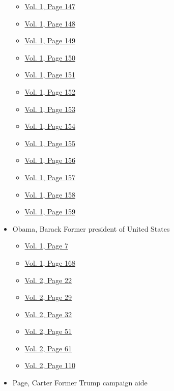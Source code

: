 \begin{itemize}
  \begin{itemize}
  \tightlist
  \item
    \protect\hyperlink{g-page-155}{Vol. 1, Page 147}
  \item
    \protect\hyperlink{g-page-156}{Vol. 1, Page 148}
  \item
    \protect\hyperlink{g-page-157}{Vol. 1, Page 149}
  \item
    \protect\hyperlink{g-page-158}{Vol. 1, Page 150}
  \item
    \protect\hyperlink{g-page-159}{Vol. 1, Page 151}
  \item
    \protect\hyperlink{g-page-160}{Vol. 1, Page 152}
  \item
    \protect\hyperlink{g-page-161}{Vol. 1, Page 153}
  \item
    \protect\hyperlink{g-page-162}{Vol. 1, Page 154}
  \item
    \protect\hyperlink{g-page-163}{Vol. 1, Page 155}
  \item
    \protect\hyperlink{g-page-164}{Vol. 1, Page 156}
  \item
    \protect\hyperlink{g-page-165}{Vol. 1, Page 157}
  \item
    \protect\hyperlink{g-page-166}{Vol. 1, Page 158}
  \item
    \protect\hyperlink{g-page-167}{Vol. 1, Page 159}
  \end{itemize}
\item
  Obama, Barack Former president of United States

  \begin{itemize}
  \tightlist
  \item
    \protect\hyperlink{g-page-15}{Vol. 1, Page 7}
  \item
    \protect\hyperlink{g-page-176}{Vol. 1, Page 168}
  \item
    \protect\hyperlink{g-page-234}{Vol. 2, Page 22}
  \item
    \protect\hyperlink{g-page-241}{Vol. 2, Page 29}
  \item
    \protect\hyperlink{g-page-244}{Vol. 2, Page 32}
  \item
    \protect\hyperlink{g-page-263}{Vol. 2, Page 51}
  \item
    \protect\hyperlink{g-page-273}{Vol. 2, Page 61}
  \item
    \protect\hyperlink{g-page-322}{Vol. 2, Page 110}
  \end{itemize}
\item
  Page, Carter Former Trump campaign aide


\end{itemize}
